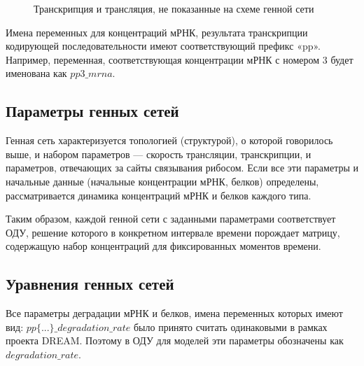 \begin{figure}[h]
  \caption{Транскрипция и трансляция, не показанные на схеме генной сети}
  \label{img:GrnImageTT}
\end{figure}

Имена переменных для концентраций мРНК, результата транскрипции кодирующей 
последовательности имеют соответствующий префикс «pp». Например, переменная, 
соответствующая концентрации мРНК с номером $3$ будет именована как $pp3\_mrna$.

\subsection{Параметры генных сетей} \label{s2_3}

Генная сеть характеризуется топологией (структурой), о которой говорилось выше, 
и набором параметров — скорость трансляции, транскрипции, и параметров, 
отвечающих за сайты связывания рибосом. Если все эти параметры и начальные 
данные (начальные концентрации мРНК, белков) определены, рассматривается
динамика концентраций мРНК и белков каждого типа.

Таким образом, каждой генной сети с заданными параметрами соответствует ОДУ, 
решение которого в конкретном интервале времени порождает матрицу, 
содержащую набор концентраций для фиксированных моментов времени.

\clearpage
\subsection{Уравнения генных сетей} \label{s2_3_up}

Все параметры деградации мРНК и белков, имена переменных которых имеют вид: 
$pp\{...\}\_degradation\_rate$ было принято считать одинаковыми в рамках проекта
DREAM. Поэтому в ОДУ для моделей эти параметры обозначены как 
$degradation\_rate$. 

